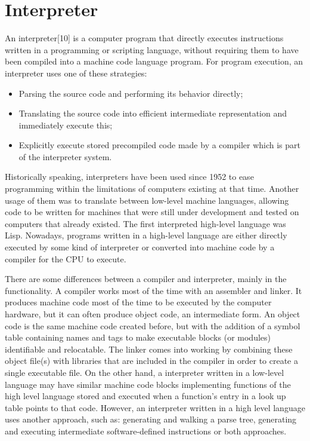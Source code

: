 \documentclass[12pt,a4paper,twoside]{report}
\begin{document}
	
\section{Interpreter}

An interpreter[10] is a computer program that directly executes instructions written in a programming or scripting language, without requiring them to have been compiled into a machine code language program. For program execution, an interpreter uses one of these strategies:

\begin{itemize}
	\item Parsing the source code and performing its behavior directly;
	\item Translating the source code into efficient intermediate representation and immediately execute this;
	\item Explicitly execute stored precompiled code made by a compiler which is part of the interpreter system.
\end{itemize}

Historically speaking, interpreters have been used since 1952 to ease programming within the limitations of computers existing at that time. Another usage of them was to translate between low-level machine languages, allowing code to be written for machines that were still under development and tested on computers that already existed. The first interpreted high-level language was Lisp. Nowadays, programs written in a high-level language are either directly executed by some kind of interpreter or converted into machine code by a compiler for the CPU to execute.

There are some differences between a compiler and interpreter, mainly in the functionality. A compiler works most of the time with an assembler and linker. It produces machine code most of the time to be executed by the computer hardware, but it can often produce object code, an intermediate form. An object code is the same machine code created before, but with the addition of a symbol table containing names and tags to make executable blocks (or modules) identifiable and relocatable. The linker comes into working by combining these object file(s) with libraries that are included in the compiler in order to create a single executable file. On the other hand, a interpreter written in a low-level language may have similar machine code blocks implementing functions of the high level language stored and executed when a function's entry in a look up table points to that code. However, an interpreter written in a high level language uses another approach, such as: generating and walking a parse tree, generating and executing intermediate software-defined instructions or both approaches.
\end{document}
